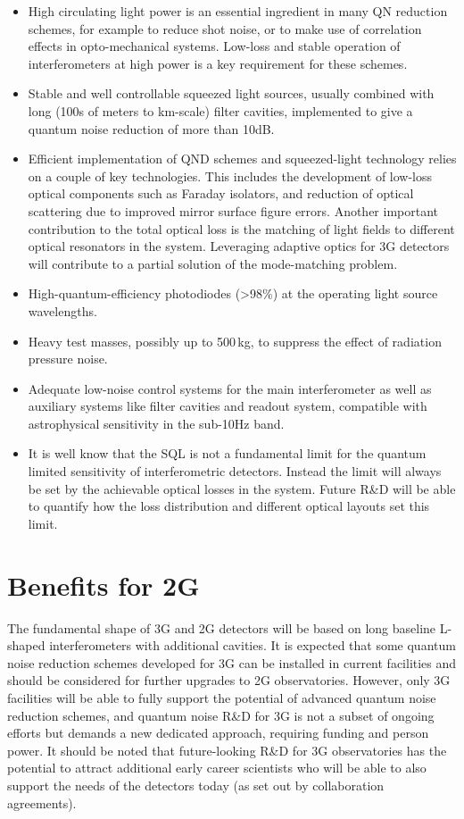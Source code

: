 \begin{itemize}
    \item High circulating light power is an essential ingredient in many QN reduction schemes, for example to reduce shot noise, or to make use of correlation effects in opto-mechanical systems. Low-loss and stable operation of interferometers at high power is a key requirement for these schemes.
\item Stable and well controllable squeezed light sources, usually combined with long (100s of meters to km-scale) filter cavities, implemented to give a quantum noise reduction of more than 10dB.
\item Efficient implementation of QND schemes and squeezed-light technology relies on a couple of key technologies. This includes the development of low-loss optical components such as Faraday isolators, and reduction of optical scattering due to improved mirror surface figure errors. Another important contribution to the total optical loss is the matching of light fields to different optical resonators in the system. Leveraging adaptive optics for 3G detectors will contribute to a partial solution of the mode-matching problem. 
\item High-quantum-efficiency photodiodes (>98\%) at the operating light source wavelengths.
\item Heavy test masses, possibly up to 500\,kg, to suppress the effect of radiation pressure noise.
\item Adequate low-noise control systems for the main interferometer as well as auxiliary systems like filter cavities and readout system, compatible with astrophysical sensitivity in the sub-10Hz band.   
\item It is well know that the SQL is not a fundamental limit for the quantum limited sensitivity of interferometric detectors. Instead the limit will always be set by the achievable optical losses in the system. Future R\&D will be able to quantify how the loss distribution and different optical layouts set this limit.
\end{itemize}

\section{Benefits for 2G} 
The fundamental shape of 3G and 2G detectors will be based on long baseline L-shaped interferometers with additional cavities. It is expected that some quantum noise reduction schemes developed for 3G can be installed in current facilities and should be considered for further upgrades to 2G observatories. However, only 3G facilities will be able to fully support the potential of advanced quantum noise reduction schemes, and quantum noise R\&D for 3G is not a subset of ongoing efforts but demands a new dedicated approach, requiring funding and person power. It should be noted that future-looking R\&D for 3G observatories has the potential to attract additional early career scientists who will be able to also support the needs of the detectors today (as set out by collaboration agreements).


